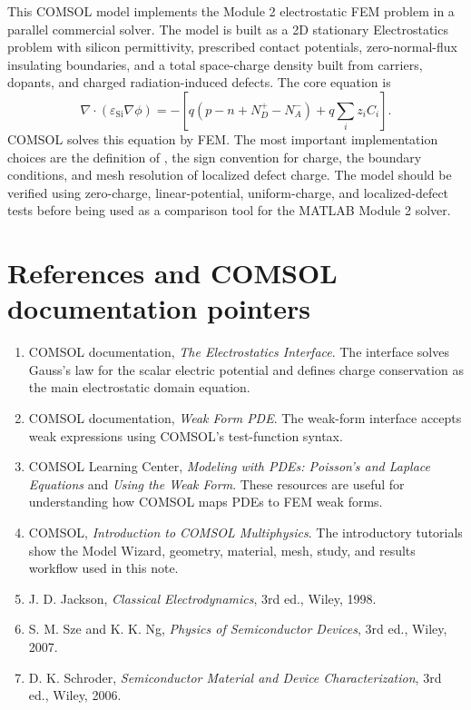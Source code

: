 \documentclass[11pt]{article}
\newcommand{\epss}{\varepsilon_{\mathrm{Si}}}
\newcommand{\code}[1]{\texttt{\detokenize{#1}}}
\begin{document}
This COMSOL model implements the Module 2 electrostatic FEM problem in a parallel commercial solver. The model is built as a 2D stationary Electrostatics problem with silicon permittivity, prescribed contact potentials, zero-normal-flux insulating boundaries, and a total space-charge density built from carriers, dopants, and charged radiation-induced defects. The core equation is
\begin{equation}
\nabla\cdot(\epss\nabla\phi)=-\left[q(p-n+N_D^+-N_A^-)+q\sum_i z_iC_i\right].
\end{equation}
COMSOL solves this equation by FEM. The most important implementation choices are the definition of \code{rho\_tot}, the sign convention for charge, the boundary conditions, and mesh resolution of localized defect charge. The model should be verified using zero-charge, linear-potential, uniform-charge, and localized-defect tests before being used as a comparison tool for the MATLAB Module 2 solver.

\section{References and COMSOL documentation pointers}

\begin{enumerate}[leftmargin=2em]
\item COMSOL documentation, \emph{The Electrostatics Interface}. The interface solves Gauss's law for the scalar electric potential and defines charge conservation as the main electrostatic domain equation.
\item COMSOL documentation, \emph{Weak Form PDE}. The weak-form interface accepts weak expressions using COMSOL's test-function syntax.
\item COMSOL Learning Center, \emph{Modeling with PDEs: Poisson's and Laplace Equations} and \emph{Using the Weak Form}. These resources are useful for understanding how COMSOL maps PDEs to FEM weak forms.
\item COMSOL, \emph{Introduction to COMSOL Multiphysics}. The introductory tutorials show the Model Wizard, geometry, material, mesh, study, and results workflow used in this note.
\item J. D. Jackson, \emph{Classical Electrodynamics}, 3rd ed., Wiley, 1998.
\item S. M. Sze and K. K. Ng, \emph{Physics of Semiconductor Devices}, 3rd ed., Wiley, 2007.
\item D. K. Schroder, \emph{Semiconductor Material and Device Characterization}, 3rd ed., Wiley, 2006.
\end{enumerate}
\end{document}
